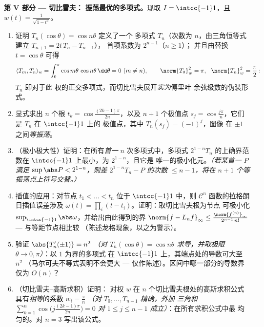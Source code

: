 \begin{problem}
\medskip
\noindent\textbf{第 V 部分 --- 切比雪夫：
振荡最优的多项式。}现取 $I = \intcc{-1}1$，且 $w(t) =
\frac1{\sqrt{1 - t^2}}$。
\begin{enumerate}[resume]
  \item 证明 $T_n(\cos\theta) = \cos n\theta$ 定义了一个
        多项式 $T_n$（次数为 $n$，由三角恒等式建立 $T_{n+1} =
        2t\,T_n - T_{n-1}$），
        首项系数为 $2^{n-1}$（$n \geq 1$）；
        并且由替换 $t = \cos\theta$ 可得
        \[
        \langle T_m, T_n\rangle_w =
        \int_0^\pi\cos m\theta\,\cos n\theta\,\dd\theta
        = 0 \ (m \neq n), \qquad
        \norm{T_0}_w^2 = \pi,\ \ \norm{T_n}_w^2 = \frac\pi2 :
        \]
        $T_n$ 即对于此
        权的正交多项式，而切比雪夫展开\emph{实为}傅里叶
        余弦级数的伪装形式。
  \item 显式求出 $n$ 个根 $t_k =
        \cos\frac{(2k-1)\pi}{2n}$，以及 $n + 1$ 个极值点
        $s_j = \cos\frac{j\pi}n$，它们是 $T_n$ 在 $\intcc{-1}1$ 上的
        极值点，其中 $T_n(s_j) = (-1)^j$，图像
        在 $\pm1$ 之间\emph{等振荡}。
  \item （极小极大性）证明：在所有\emph{首一}
        $n$ 次多项式中，多项式
        $2^{1-n}T_n$ 的上确界范数在
        $\intcc{-1}1$ 上最小，为 $2^{1-n}$，且它是
        唯一的极小化元。\emph{（若某首一 $P$ 满足
        $\sup\abs P < 2^{1-n}$，则差 $2^{1-n}T_n -
        P$ 的次数 $\leq n-1$，将在
        $n+1$ 个等振荡点上符号交替。）}
  \item 插值的应用：对节点 $t_1 < \dots
        < t_n$ 位于 $\intcc{-1}1$ 中，则
        $\mathcal C^n$ 函数的拉格朗日插值误差涉及
        $\omega(t) = \prod_i(t - t_i)$。证明：取切比雪夫根为节点
        可极小化
        $\sup_{\intcc{-1}1}\abs\omega$，并给出由此得到的界
        $\norm{f -
        L_nf}_\infty \leq \frac{\norm{f^{(n)}}_\infty}
        {2^{n-1}\,n!}$ --- 与等距节点相比较
        （陈述龙格现象，以之为警示）。
  \item 验证 $\abs{T_n'(\pm1)} = n^2$ \emph{（对
        $T_n(\cos\theta) = \cos n\theta$ 求导，并取极限
        $\theta \to 0, \pi$）}：以 $1$ 为界的多项式
        在 $\intcc{-1}1$ 上，其端点处的导数可大至 $n^2$
        （马尔可夫不等式表明不会更大 ---
        仅作陈述）。区间中哪一部分的导数界
        仅为 $O(n)$？
  \item （切比雪夫--高斯求积）证明：
        对权 $w$ 在 $n$ 个切比雪夫根处的高斯求积公式
        具有\emph{相等}的系数 $w_i = \frac\pi n$
        \emph{（对 $T_0, \dots, T_{n-1}$ 精确，外加
        三角和
        $\sum_{k=1}^n\cos\bigl(j\tfrac{(2k-1)\pi}{2n}\bigr) =
        0$ 对 $1 \leq j \leq n - 1$ 成立）}：在所有求积公式中最
        均匀的。对 $n = 3$ 写出该公式。
\end{enumerate}


\end{problem}

